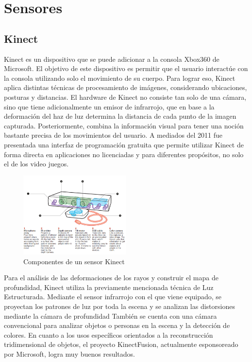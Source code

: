    
\section{Sensores}
\subsection{Kinect}

Kinect es un dispositivo que se puede adicionar a la consola  Xbox360 de Microsoft. El objetivo de este dispositivo es permitir que el usuario interactúe con la consola utilizando solo el movimiento de su cuerpo. Para lograr eso, Kinect aplica distintas técnicas de procesamiento de imágenes, considerando ubicaciones, posturas y distancias. El hardware de Kinect no consiste tan solo de una cámara, sino que tiene adicionalmente un emisor de infrarrojo, que en base a la deformación del haz de luz determina la distancia de cada punto de la imagen capturada. Posteriormente, combina la información visual para tener una noción bastante precisa de los movimientos del usuario. A mediados del 2011 fue presentada una interfaz de programación gratuita que permite utilizar Kinect de forma directa en aplicaciones no licenciadas y para diferentes propósitos, no solo el de los video juegos.

\begin{figure}[H]
  \centering
    \includegraphics[width=0.5\textwidth]{./Cap6_reconstruccion/kinect.PNG}
  \caption{Componentes de un sensor Kinect}
  \label{fig:Kinect}
\end{figure}

Para el análisis de las deformaciones de los rayos y construir el mapa de profundidad, Kinect utiliza la previamente mencionada técnica de Luz Estructurada. Mediante el sensor infrarrojo con el que viene equipado, se proyectan los patrones de luz por toda la escena y se analizan las distorsiones mediante la cámara de profundidad
También se cuenta con una cámara convencional para analizar objetos o personas en la escena y la detección de colores.
En cuanto a los usos específicos orientados a la reconstrucción tridimensional de objetos, el proyecto KinectFusion, actualmente esponsoreado por Microsoft, logra muy buenos resultados\cite{KinectFusion}.

